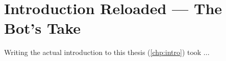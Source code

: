 \chapter{Introduction Reloaded --- The Bot's Take}
\label{app:intro}

Writing the actual introduction to this thesis (\cref{chp:intro}) took ...
